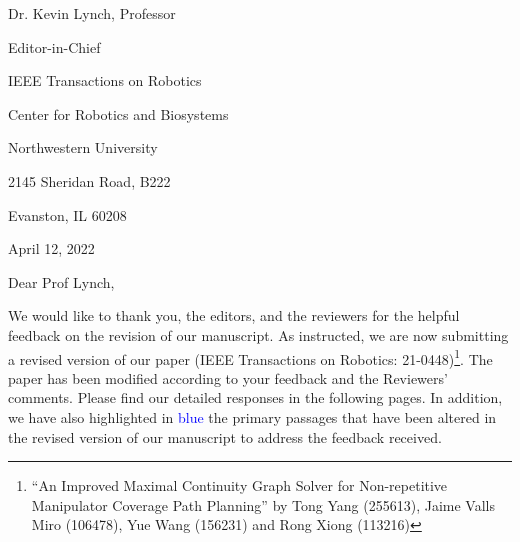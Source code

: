 \documentclass[11pt]{article}
\author{Jaime Valls Miro \and Tong Yang}
\begin{document}


\setlength{\parindent}{0pt}
\hspace*{0.62\linewidth}
\begin{minipage}{0.7\linewidth}
Dr. Kevin Lynch, Professor \par 
Editor-in-Chief \par 
IEEE Transactions on Robotics \par 
Center for Robotics and Biosystems\par 
Northwestern University\par
2145 Sheridan Road, B222\par
Evanston, IL 60208\par \bigskip
April 12, 2022 %
\end{minipage}

\vspace{2cm}


Dear Prof Lynch, \par \bigskip

We would like to thank you, the editors, and the reviewers for the helpful feedback on the revision of our manuscript. As instructed, we are now submitting a revised version of our paper (IEEE Transactions on Robotics: 21-0448)\footnote{``An Improved Maximal Continuity Graph Solver for Non-repetitive Manipulator Coverage Path Planning'' by Tong Yang (255613), Jaime Valls Miro (106478), Yue Wang (156231) and Rong Xiong (113216)}. The paper has been modified according to your feedback and the Reviewers' comments. Please find our detailed responses in the following pages. 
In addition, we have also highlighted in \textcolor{blue}{blue} the primary passages that have been altered in the revised version of our manuscript to address the feedback received.
\end{document}
